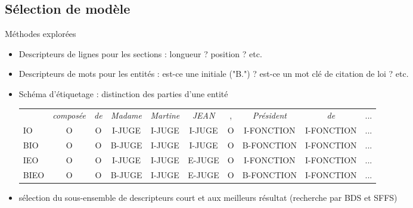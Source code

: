\subsection{Sélection de modèle}
\begin{frame}[t]{\mysubsectiontitle}		
	Méthodes explorées
	\begin{itemize} \scriptsize
		\item Descripteurs de lignes pour les sections : longueur ? position ? etc.
		\item Descripteurs de mots pour les entités : est-ce une initiale ("B.") ? est-ce un mot clé de citation de loi ? etc.
		\item Schéma d'étiquetage : distinction des parties d'une entité \tiny
		\begin{tabular}{l|ccccccccc}
			& \textit{composée} & \textit{de} & \textit{Madame} & \textit{Martine} & \textit{JEAN} & , & \textit{Président} & \textit{de} & ... \\ 
			IO & O & O & I-JUGE & I-JUGE & I-JUGE & O & I-FONCTION & I-FONCTION & ... \\
			BIO & O & O & B-JUGE & I-JUGE & I-JUGE & O & B-FONCTION & I-FONCTION & ... \\
			IEO & O & O & I-JUGE & I-JUGE & E-JUGE & O & I-FONCTION & I-FONCTION & ...\\
			BIEO & O & O & B-JUGE & I-JUGE & E-JUGE & O & B-FONCTION & I-FONCTION & ... \\
		\end{tabular}
		\item \scriptsize sélection du sous-ensemble de descripteurs court et aux meilleurs résultat (recherche par BDS et SFFS)
	\end{itemize}	
\end{frame}

